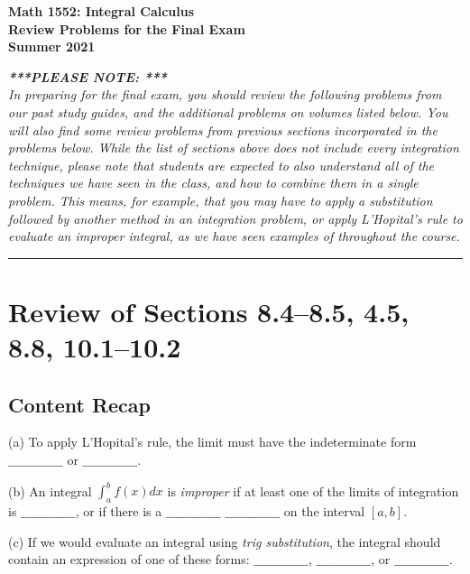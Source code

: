\documentclass[12pt]{article}
\begin{document}
\vskip 1in
\begin{center}
     {\LARGE{\bf Math 1552: Integral Calculus \\[0.2ex] 
                Review Problems for the Final Exam \\[1ex] 
                Summer 2021
     }}
\end{center} 
     
     \bigskip 
     \noindent
     \emph{\textbf{***PLEASE NOTE: ***} \\ 
           In preparing for the final exam, you should review the 
           following problems from our past study guides, and the additional 
           problems on volumes listed below.
           You will also find some review problems 
           from previous sections incorporated in the problems below. 
           While the list of sections above does 
           not include every integration technique, please note that students are expected 
           to also understand all of the techniques we have seen in the class, and how to 
           combine them in a single problem. This means, for example, that you may have to 
           apply a substitution followed by another method in an integration problem, or apply 
           L'Hopital's rule to evaluate an improper integral, as we have seen examples of 
           throughout the course.
     }


\vskip 0.2in

\bigskip\hrule\bigskip

\section{Review of Sections 8.4--8.5, 4.5, 8.8, 10.1--10.2}

\subsection*{Content Recap}

\noindent (a) To 
apply L'Hopital's rule, the limit must have 
the indeterminate form 
$\_\_\_\_\_\_\_\_\_\_\_\_\_$ or $\_\_\_\_\_\_\_\_\_\_\_\_\_$.

\bigskip
\noindent (b) An integral $\int_a^b f(x) dx$ is {\it improper\/} if at 
least one of the 
limits of integration is \hfil\break $\_\_\_\_\_\_\_\_\_\_\_\_\_$, or if 
there is a
$\_\_\_\_\_\_\_\_\_\_\_\_\_$ $\_\_\_\_\_\_\_\_\_\_\_\_\_$ on the interval 
$[a,b]$.

\bigskip
\noindent (c) If we would evaluate an integral using {\it trig 
substitution\/}, the 
integral should contain an expression of one of these forms:
$\_\_\_\_\_\_\_\_\_\_\_\_\_$, $\_\_\_\_\_\_\_\_\_\_\_\_\_$, or 
$\_\_\_\_\_\_\_\_\_\_\_\_\_$.
\end{document}
